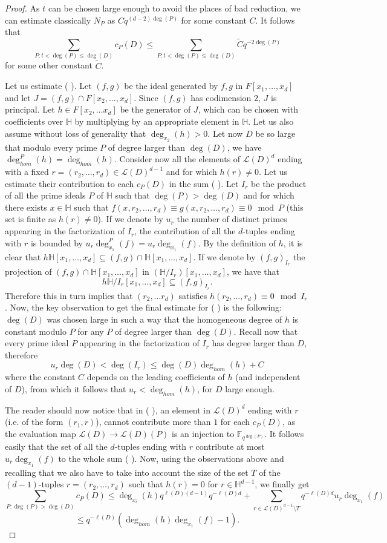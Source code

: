 \documentclass[10pt]{amsart}
\newcommand{\vF}{\mathbb{F}}
\newcommand{\vH}{\mathbb{H}}
\newcommand{\cL}{\mathcal{L}}
\newcommand{\RN}[1]{%
  \textup{\uppercase\expandafter{\romannumeral#1}}%
}
\theoremstyle{definition}
\theoremstyle{remark}
\numberwithin{equation}{section}
\begin{document}
\begin{proof}
As $t$ can be chosen large enough to avoid the places of bad reduction, we can estimate classically $N_P$ as $C q^{(d-2)\deg(P)}$ for some constant $C$. It follows that
\[\sum_{P:t<\deg(P)\leq \deg(D)} c_P(D)\leq \sum_{P:t<\deg(P)\leq \deg(D)}  \widetilde{C} q^{-2\deg(P)}\]
for some other constant $\widetilde C$.

Let us estimate (\RN{2}). Let $(f,g)$ be the ideal generated by 
$f,g$ in $F[x_1,\dots,x_d]$ and let $J=(f,g)\cap F[x_2,\dots,x_d]$. Since $(f,g)$ has codimension $2$, $J$ is principal. Let $h\in F[x_2,\dots x_d]$ be the generator of $J$, which can be chosen with coefficients over $\vH$ by multiplying by an appropriate element in $\vH$. 
Let us also assume without loss of generality that $\deg_{x_2}(h)>0$.
Let now $D$ be so large that modulo every prime $P$ of degree larger than $\deg(D)$, we have $\deg_{hom}^P(h)=\deg_{hom}(h)$.
Consider now all the  elements of $\cL(D)^d$ ending with a fixed $r=(r_2,\dots,r_d)\in \cL(D)^{d-1}$ and for which $h(r)\neq 0$.  Let us estimate their contribution to each $c_P(D)$ in the sum (\RN{2}). 
Let $I_r$ be the product of all the prime ideals $P$ of $\vH$ such that $\deg(P)>\deg(D)$ and for which there exists $x\in \vH$ such that $f(x,r_2,\dots,r_d)\equiv g(x,r_2,\dots,r_d)\equiv 0 \mod P$ (this set is finite as $h(r)\neq 0$). If we denote by $u_r$ the number of distinct primes appearing in the factorization of $I_r$, the contribution of all the $d$-tuples ending with $r$ is bounded by $u_r \deg_{x_1}^P(f)=u_r\deg_{x_1}(f)$.
By the definition of $h$, it is clear that $h \vH[x_1,\dots,x_d] \subseteq (f,g)\cap \vH[x_1,\dots,x_d]$. If we denote by $(f,g)_{I_r}$ the projection of $(f,g)\cap \vH[x_1,\dots,x_d]$ in $(\vH/I_r)[x_1,\dots,x_d]$, we have that 
\[h \vH/I_r[x_1,\dots,x_d] \subseteq (f,g)_{I_r}.\]
Therefore this  in turn implies that $(r_2,\dots r_d)$  satisfies $h(r_2,\dots, r_d)\equiv 0 \mod I_r$.
Now, the key observation to get the final estimate for (\RN{2}) is the following: 
$\deg(D)$ was chosen large in such a way that the homogeneous degree of $h$
is constant modulo $P$  for any $P$ of degree larger than $\deg(D)$. 
Recall now that every prime ideal $P$ appearing in the factorization of $I_r$ has degree larger than $D$, therefore
\[u_r\deg(D)< \deg(I_r)\leq \deg(D)\deg_{hom}(h)+C\]
where the constant $C$ depends on the leading coefficients of $h$ (and independent of $D$), from which it follows that $u_r<\deg_{hom}(h)$, for $D$ large enough.

The reader should now notice that in (\RN{2}), an element in $\cL(D)^d$ ending with $r$ (i.e. of the form $(r_1,r)$), cannot contribute more than $1$ for each $c_P(D)$, as the evaluation map $\cL(D)\rightarrow \cL(D)(P)$ is an injection to $\vF_{q^{\deg(P)}}$.
It follows easily that the set of all the $d$-tuples ending with $r$ contribute at most $u_r\deg_{x_1}(f)$ to the whole sum (\RN{2}).
Now, using the observations above and recalling that we also have to take into account the size of the set $T$ of the $(d-1)$-tuples $r=(r_2,\dots, r_d)$ such that $h(r)=0$ for $r\in \vH^{d-1}$, we finally get
\[\sum_{P:\deg(P)>\deg(D)} c_P(D)\leq \deg_{x_i}(h)q^{\ell(D)(d-1)}q^{-\ell(D)d}+ \sum_{r\in \cL(D)^{d-1}\setminus T} q^{-\ell(D)d}u_r\deg_{x_1}(f)\]
\[\leq q^{-\ell(D)} (\deg_{hom}(h)\deg_{x_1}(f)-1).\]


\end{proof}
\end{document}
